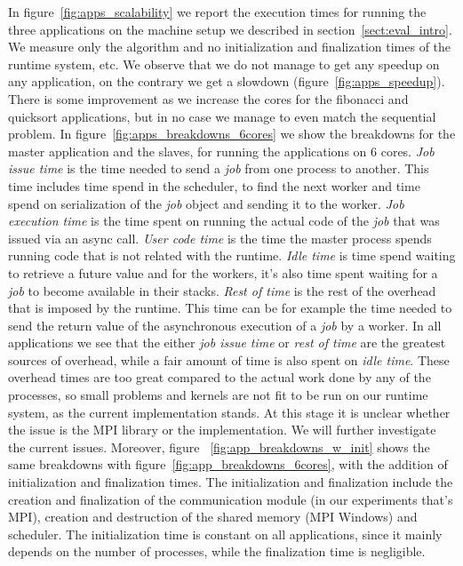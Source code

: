 	In figure~\ref{fig:apps_scalability} we report the execution times for running the three applications on the
machine setup we described in section~\ref{sect:eval_intro}.  We measure only the algorithm and no initialization
and finalization times of the runtime system, etc.
We observe that we do not manage to get any speedup on 
any application, on the contrary we get a slowdown (figure~\ref{fig:apps_speedup}).
There is some improvement as we increase the cores for 
the fibonacci and quicksort applications, but in no case we manage to even match the sequential problem.  In 
figure~\ref{fig:apps_breakdowns_6cores} 
we show the breakdowns for the master application and the slaves, for running the applications on 6 cores.
\emph{Job issue time} is the time needed to send a \emph{job} from one process to another. This time includes
time spend in the scheduler, to find the next worker and time spend on serialization of the \emph{job} object
and sending it to the worker.  \emph{Job execution time} is the time spent on running the actual code of the
\emph{job} that was issued via an async call.  \emph{User code time} is the time the master process spends
running code that is not related with the runtime.  \emph{Idle time} is time spend waiting to retrieve a future 
value and for the workers, it's also time spent waiting for a \emph{job} to become available in their stacks.
\emph{Rest of time} is the rest of the overhead that is imposed by the runtime.  This time can be for example 
the time needed to send the return value of the asynchronous execution of a \emph{job} by a worker.  In all 
applications we see that the either \emph{job issue time} or \emph{rest of time} are the greatest sources of 
overhead, while a fair amount of time is also spent on \emph{idle time}.  These overhead times are too great
compared to the actual work done by any of the processes, so small problems and kernels are not fit to be 
run on our runtime system, as the current implementation stands.  At this stage it is unclear whether the issue
is the MPI library or the implementation.  We will further investigate the current issues.  Moreover, figure
~\ref{fig:app_breakdowns_w_init} shows the same breakdowns with figure~\ref{fig:app_breakdowns_6cores}, with 
the addition of initialization and finalization times.  The initialization and finalization include the 
creation and finalization of the communication module (in our experiments that's MPI), creation and destruction
of the shared memory (MPI Windows) and scheduler.  The initialization time is constant on all applications, since
it mainly depends on the number of processes, while the finalization time is negligible. 


